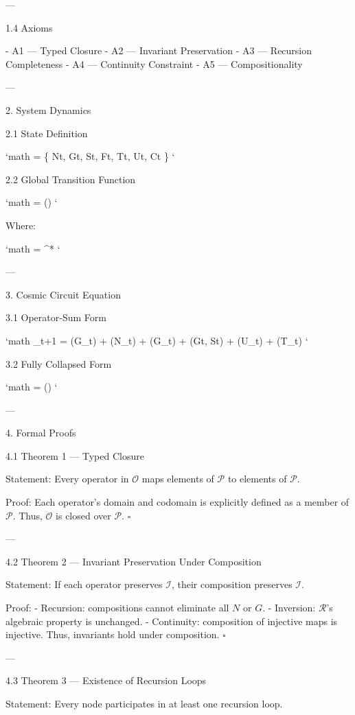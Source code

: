 ---

1.4 Axioms

- A1 — Typed Closure  
- A2 — Invariant Preservation  
- A3 — Recursion Completeness  
- A4 — Continuity Constraint  
- A5 — Compositionality  

---

2. System Dynamics

2.1 State Definition

`math
\Sigmat = \{ Nt, Gt, St, Ft, Tt, Ut, Ct \}
`

2.2 Global Transition Function

`math
 = \Phi(\Sigmat)
`

Where:

`math
\Phi = ^* \;\; 
`

---

3. Cosmic Circuit Equation

3.1 Operator‑Sum Form

`math
\Sigma_{t+1} =
(G_t)
+ (N_t)
+ (G_t)
+ (Gt, St)
+ (U_t)
+ (T_t)
`

3.2 Fully Collapsed Form

`math
 = \Phi(\Sigmat)
`

---

4. Formal Proofs

4.1 Theorem 1 — Typed Closure

Statement:  
Every operator in \(\mathcal{O}\) maps elements of \(\mathcal{P}\) to elements of \(\mathcal{P}\).

Proof:  
Each operator’s domain and codomain is explicitly defined as a member of \(\mathcal{P}\).  
Thus, \(\mathcal{O}\) is closed over \(\mathcal{P}\).  
\(\square\)

---

4.2 Theorem 2 — Invariant Preservation Under Composition

Statement:  
If each operator preserves \(\mathcal{I}\), their composition preserves \(\mathcal{I}\).

Proof:  
- Recursion: compositions cannot eliminate all \(N\) or \(G\).  
- Inversion: \(\mathcal{R}\)’s algebraic property is unchanged.  
- Continuity: composition of injective maps is injective.  
Thus, invariants hold under composition.  
\(\square\)

---

4.3 Theorem 3 — Existence of Recursion Loops

Statement:  
Every node participates in at least one recursion loop.

